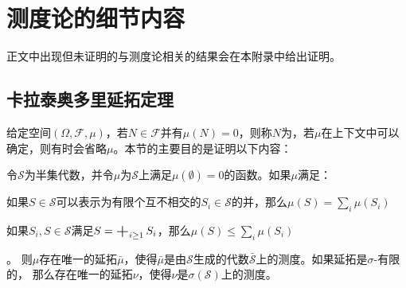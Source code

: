 \documentclass[main.tex]{subfiles}
\begin{document}
\appendix
\chapter{测度论的细节内容}
正文中出现但未证明的与测度论相关的结果会在本附录中给出证明。
\section{卡拉泰奥多里延拓定理} \label{sec:a.1}
给定空间\((\Omega, \mathcal{F}, \mu)\)，若\(N \in \mathcal{F}\)并有\(\mu(N) = 0\)，则称\(N\)为，若\(\mu\)在上下文中可以确定，则有时会省略\(\mu\)。本节的主要目的是证明以下内容：
\begin{theorem} \label{thm:a.1.1}
	令\(\mathcal{S}\)为半集代数，并令\(\mu\)为\(\mathcal{S}\)上满足\(\mu(\emptyset) = 0\)的函数。如果\(\mu\)满足：
	\begin{enumerate*}
		\item \label{thm:a.1.1.1}
		如果\(S \in \mathcal{S}\)可以表示为有限个互不相交的\(S_i \in \mathcal{S}\)的并，那么\(\mu(S) = \sum_{i}\mu(S_i)\)
		\item \label{thm:a.1.1.2} 如果\(S_i, S \in \mathcal{S}\)满足\(S = \bigplus_{i \geq 1}S_i\)，那么\(\mu(S) \leq \sum_{i}\mu(S_i)\)
	\end{enumerate*}。
	则\(\mu\)存在唯一的延拓\(\bar{\mu}\)，使得\(\bar{\mu}\)是由\(\mathcal{S}\)生成的代数\(\bar{\mathcal{S}}\)上的测度。如果延拓是\(\sigma\)-有限的，
	那么存在唯一的延拓\(\nu\)，使得\(\nu\)是\(\sigma(\mathcal{S})\)上的测度。
\end{theorem}
\end{document}
